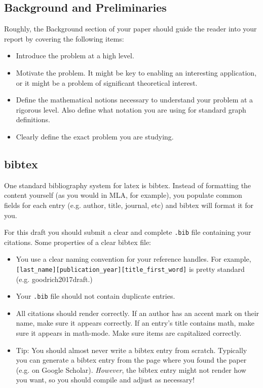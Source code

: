 \documentclass{article}
\begin{document}
\subsection*{Background and Preliminaries}
Roughly, the Background section of your paper should guide the reader into your report by covering the following items:
\begin{itemize}
\item Introduce the problem at a high level.
\item Motivate the problem. It might be key to enabling an interesting application, or it might be a problem of significant theoretical interest.
\item Define the mathematical notions necessary to understand your problem at a rigorous level. Also define what notation you are using for standard graph definitions.
\item Clearly define the exact problem you are studying.
\end{itemize}

\subsection*{bibtex}
One standard bibliography system for latex is bibtex. Instead of formatting the content yourself (as you would in MLA, for example), you populate common fields for each entry (e.g. author, title, journal, etc) and bibtex will format it for you.

For this draft you should submit a clear and complete \texttt{.bib} file containing your citations. Some properties of a clear bibtex file:
\begin{itemize}
\item You use a clear naming convention for your reference handles. For example, \\ \texttt{[last\_name][publication\_year][title\_first\_word]} is pretty standard (e.g. goodrich2017draft.)
\item Your \texttt{.bib} file should not contain duplicate entries.
\item All citations should render correctly. If an author has an accent mark on their name, make sure it appears correctly. If an entry's title contains math, make sure it appears in math-mode. Make sure items are capitalized correctly.
\item Tip: You should almost never write a bibtex entry from scratch. Typically you can generate a bibtex entry from the page where you found the paper (e.g. on Google Scholar). \emph{However}, the bibtex entry might not render how you want, so you should compile and adjust as necessary!
\end{itemize}
\end{document}
